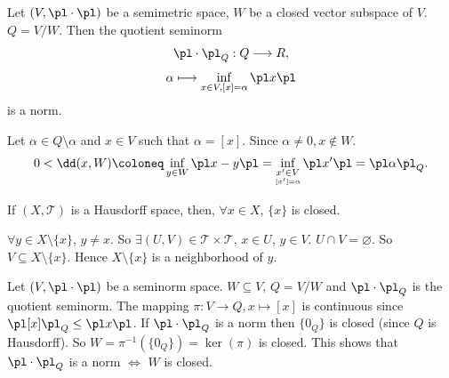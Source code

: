 \begin{corollaryenv}
    Let $(V,\pl\cdot\pl)$ be a semimetric space, $W$ be a closed vector subspace of $V$. $Q=V/W$. Then the quotient seminorm 
    $$\pl\cdot\pl_Q:Q\longrightarrow R,$$
    $$\alpha\longmapsto \inf_{x\in V,[x]=\alpha}\pl x\pl$$
    is a norm.
\end{corollaryenv}
\begin{proofenv}
    Let $\alpha\in Q\setminus{\alpha}$ and $x\in V$ such that $\alpha=[x]$. Since $\alpha\neq0, x\notin W$.
    $$0<\dd(x,W)\coloneq\inf_{y\in W}\pl x-y\pl=\inf_{\underset{[x']=\alpha}{x'\in V}}\pl x'\pl=\pl \alpha\pl_Q.$$
\end{proofenv}
\begin{propositionenv}
    If $(X,\mathscr{T})$ is a Hausdorff space, then, $\forall x\in X$, $\{x\}$ is closed.
\end{propositionenv}
\begin{proofenv}
    $\forall y\in X\setminus\{x\}$, $y\neq x$. So $\exists (U,V)\in \mathscr{T}\times\mathscr{T}$, $x\in U$, $y\in V$. $U\cap V=\varnothing$. So $V\subseteq X\setminus\{x\}$. Hence $X\setminus\{x\}$ is a neighborhood of $y$. 
\end{proofenv}
\begin{remark}
    Let $(V,\pl \cdot\pl)$ be a seminorm space. $W\subseteq V$, $Q=V/W$ and $\pl\cdot\pl_Q$ is the quotient seminorm. The mapping $\pi:V\longrightarrow Q, x\longmapsto [x]$  is continuous since $\pl[x]\pl_Q\le \pl x\pl$. If $\pl\cdot\pl_Q$ is a norm then $\{0_Q\}$ is closed (since $Q$ is Hausdorff). So $W=\pi^{-1}(\{0_Q\})=\ker(\pi)$ is closed. This shows that $\pl\cdot\pl_Q$ is a norm $\Leftrightarrow$ $W$ is closed.
\end{remark}



